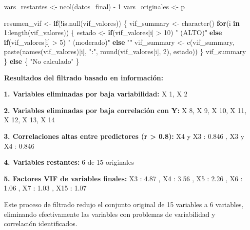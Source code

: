 \documentclass[
  letterpaper,
  DIV=11,
  numbers=noendperiod]{scrreprt}
\newenvironment{Shaded}{\begin{snugshade}}{\end{snugshade}}
\newcommand{\ControlFlowTok}[1]{\textcolor[rgb]{0.00,0.23,0.31}{\textbf{#1}}}
\newcommand{\DecValTok}[1]{\textcolor[rgb]{0.68,0.00,0.00}{#1}}
\newcommand{\FunctionTok}[1]{\textcolor[rgb]{0.28,0.35,0.67}{#1}}
\newcommand{\NormalTok}[1]{\textcolor[rgb]{0.00,0.23,0.31}{#1}}
\newcommand{\OtherTok}[1]{\textcolor[rgb]{0.00,0.23,0.31}{#1}}
\newcommand{\SpecialCharTok}[1]{\textcolor[rgb]{0.37,0.37,0.37}{#1}}
\newcommand{\StringTok}[1]{\textcolor[rgb]{0.13,0.47,0.30}{#1}}
\begin{document}
\begin{tcolorbox}
\begin{Shaded}
\begin{Highlighting}[]
\NormalTok{vars\_restantes }\OtherTok{\textless{}{-}} \FunctionTok{ncol}\NormalTok{(datos\_final) }\SpecialCharTok{{-}} \DecValTok{1}
\NormalTok{vars\_originales }\OtherTok{\textless{}{-}}\NormalTok{ p}

\NormalTok{resumen\_vif }\OtherTok{\textless{}{-}} \ControlFlowTok{if}\NormalTok{(}\SpecialCharTok{!}\FunctionTok{is.null}\NormalTok{(vif\_valores)) \{}
\NormalTok{  vif\_summary }\OtherTok{\textless{}{-}} \FunctionTok{character}\NormalTok{()}
  \ControlFlowTok{for}\NormalTok{(i }\ControlFlowTok{in} \DecValTok{1}\SpecialCharTok{:}\FunctionTok{length}\NormalTok{(vif\_valores)) \{}
\NormalTok{    estado }\OtherTok{\textless{}{-}} \ControlFlowTok{if}\NormalTok{(vif\_valores[i] }\SpecialCharTok{\textgreater{}} \DecValTok{10}\NormalTok{) }\StringTok{" (ALTO)"} \ControlFlowTok{else} \ControlFlowTok{if}\NormalTok{(vif\_valores[i] }\SpecialCharTok{\textgreater{}} \DecValTok{5}\NormalTok{) }\StringTok{" (moderado)"} \ControlFlowTok{else} \StringTok{""}
\NormalTok{    vif\_summary }\OtherTok{\textless{}{-}} \FunctionTok{c}\NormalTok{(vif\_summary, }\FunctionTok{paste}\NormalTok{(}\FunctionTok{names}\NormalTok{(vif\_valores)[i], }\StringTok{":"}\NormalTok{, }\FunctionTok{round}\NormalTok{(vif\_valores[i], }\DecValTok{2}\NormalTok{), estado))}
\NormalTok{  \}}
\NormalTok{  vif\_summary}
\NormalTok{\} }\ControlFlowTok{else}\NormalTok{ \{}
  \StringTok{"No calculado"}
\NormalTok{\}}
\end{Highlighting}
\end{Shaded}

\textbf{Resultados del filtrado basado en información:}

\textbf{1. Variables eliminadas por baja variabilidad:} X 1, X 2

\textbf{2. Variables eliminadas por baja correlación con Y:} X 8, X 9, X
10, X 11, X 12, X 13, X 14

\textbf{3. Correlaciones altas entre predictores (\textbar r\textbar{}
\textgreater{} 0.8):} X4 y X3 : 0.846 , X3 y X4 : 0.846

\textbf{4. Variables restantes:} 6 de 15 originales

\textbf{5. Factores VIF de variables finales:} X3 : 4.87 , X4 : 3.56 ,
X5 : 2.26 , X6 : 1.06 , X7 : 1.03 , X15 : 1.07

Este proceso de filtrado redujo el conjunto original de 15 variables a 6
variables, eliminando efectivamente las variables con problemas de
variabilidad y correlación identificados.

\end{tcolorbox}
\end{document}
